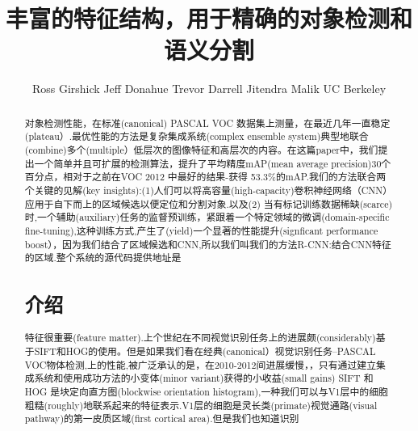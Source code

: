 \documentclass[a4paper,UTF8]{ctexart}
\theoremstyle{definition}
\begin{document}
\title{丰富的特征结构，用于精确的对象检测和语义分割}
\author{Ross Girshick Jeff Donahue Trevor Darrell Jitendra Malik UC Berkeley}
\maketitle
\begin{abstract}
对象检测性能，在标准(canonical) PASCAL VOC 数据集上测量，在最近几年一直稳定(plateau）.最优性能的方法是复杂集成系统(complex ensemble system)典型地联合(combine)多个(multiple）低层次的图像特征和高层次的内容。在这篇paper中，我们提出一个简单并且可扩展的检测算法，提升了平均精度mAP(mean average precision)30个百分点，相对于之前在VOC 2012 中最好的结果-获得 53.3\%的mAP.我们的方法联合两个关键的见解(key insights):(1)人们可以将高容量(high-capacity)卷积神经网络（CNN）应用于自下而上的区域候选以便定位和分割对象.以及(2) 当有标记训练数据稀缺(scarce)时,一个辅助(auxiliary)任务的监督预训练，紧跟着一个特定领域的微调(domain-specific fine-tuning),这种训练方式,产生了(yield)一个显著的性能提升(signficant performance boost），因为我们结合了区域候选和CNN,所以我们叫我们的方法R-CNN:结合CNN特征的区域.整个系统的源代码提供地址是

\section{介绍}
特征很重要(feature matter).上个世纪在不同视觉识别任务上的进展颇(considerably)基于SIFT和HOG的使用。但是如果我们看在经典(canonical）视觉识别任务--PASCAL VOC物体检测,上的性能,被广泛承认的是，在2010-2012间进展缓慢，，只有通过建立集成系统和使用成功方法的小变体(minor variant)获得的小收益(small gains)
SIFT 和HOG 是块定向直方图(blockwise orientation histogram),一种我们可以与V1层中的细胞粗糙(roughly)地联系起来的特征表示.V1层的细胞是灵长类(primate)视觉通路(visual pathway)的第一皮质区域(first cortical area).但是我们也知道识别
\end{abstract}
\end{document}
